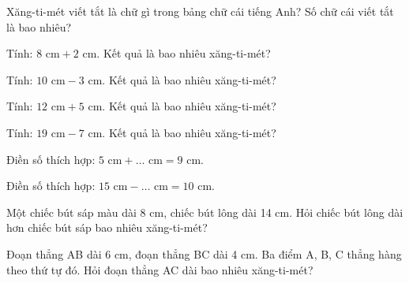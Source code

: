 \begin{ex}
Xăng-ti-mét viết tắt là chữ gì trong bảng chữ cái tiếng Anh? Số chữ cái viết tắt là bao nhiêu?
\end{ex}

\begin{ex}
Tính: $8\text{ cm} + 2\text{ cm}$. Kết quả là bao nhiêu xăng-ti-mét?
\end{ex}

\begin{ex}
Tính: $10\text{ cm} - 3\text{ cm}$. Kết quả là bao nhiêu xăng-ti-mét?
\end{ex}

\begin{ex}
Tính: $12\text{ cm} + 5\text{ cm}$. Kết quả là bao nhiêu xăng-ti-mét?
\end{ex}

\begin{ex}
Tính: $19\text{ cm} - 7\text{ cm}$. Kết quả là bao nhiêu xăng-ti-mét?
\end{ex}

\begin{ex}
Điền số thích hợp: $5\text{ cm} + \dots\text{ cm} = 9\text{ cm}$.
\end{ex}

\begin{ex}
Điền số thích hợp: $15\text{ cm} - \dots\text{ cm} = 10\text{ cm}$.
\end{ex}

\begin{ex}
Một chiếc bút sáp màu dài 8 cm, chiếc bút lông dài 14 cm. Hỏi chiếc bút lông dài hơn chiếc bút sáp bao nhiêu xăng-ti-mét?
\end{ex}

\begin{ex}
Đoạn thẳng AB dài 6 cm, đoạn thẳng BC dài 4 cm. Ba điểm A, B, C thẳng hàng theo thứ tự đó. Hỏi đoạn thẳng AC dài bao nhiêu xăng-ti-mét?
\end{ex}

